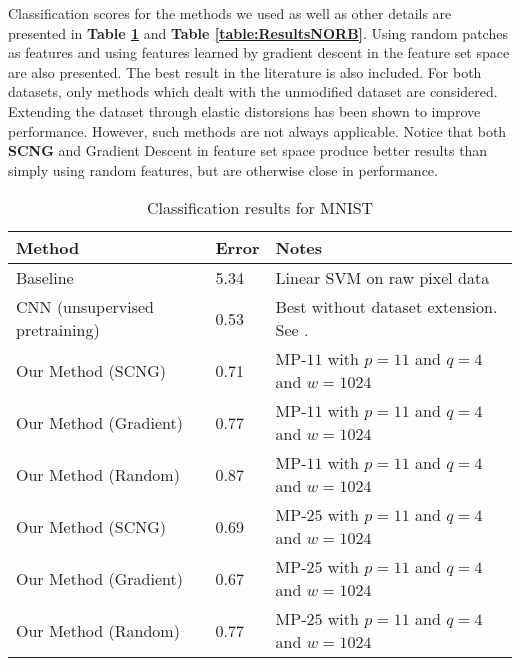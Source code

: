 \documentclass[runningheads,a4paper]{llncs}
\begin{document}
Classification scores for the methods we used as well as other details are presented in \textbf{Table \ref{table:ResultsMNIST}} and \textbf{Table \ref{table:ResultsNORB}}. Using random patches as features and using features learned by gradient descent \cite{sparse-coding-strategy-V1} in the feature set space are also presented. The best result in the literature is also included. For both datasets, only methods which dealt with the unmodified dataset are considered. Extending the dataset through elastic distorsions \cite{best-practices-cnn} has been shown to improve performance. However, such methods are not always applicable. Notice that both \textbf{SCNG} and Gradient Descent in feature set space produce better results than simply using random features, but are otherwise close in performance.

\renewcommand{\arraystretch}{1.2}
\begin{table}
  \caption{Classification results for MNIST}
  \label{table:ResultsMNIST}
  \begin{tabularx}{\textwidth}{|l|l|X|}
    \hline
    \textbf{Method} & \textbf{Error} & \textbf{Notes} \\ \hline\hline
    Baseline & 5.34 & Linear SVM on raw pixel data \\ \hline
    CNN (unsupervised pretraining) & 0.53 & Best without dataset extension. See \cite{best-architecture-object-recognition}. \\ \hline
    Our Method (SCNG) & 0.71 & MP-$11$ with $p=11$ and $q=4$ and $w=1024$ \\ \hline
    Our Method (Gradient) & 0.77 & MP-$11$ with $p=11$ and $q=4$ and $w=1024$ \\ \hline
    Our Method (Random) & 0.87 & MP-$11$ with $p=11$ and $q=4$ and $w=1024$ \\ \hline
    Our Method (SCNG) & 0.69 & MP-$25$ with $p=11$ and $q=4$ and $w=1024$ \\ \hline
    Our Method (Gradient) & 0.67 & MP-$25$ with $p=11$ and $q=4$ and $w=1024$ \\ \hline
    Our Method (Random) & 0.77 & MP-$25$ with $p=11$ and $q=4$ and $w=1024$ \\ \hline
  \end{tabularx}
\end{table}
\renewcommand{\arraystretch}{1.0}
\end{document}
